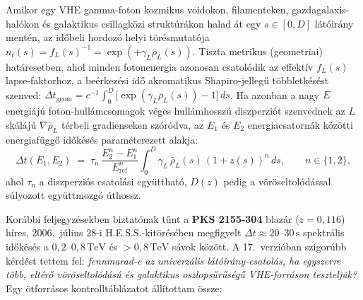 \par
Amikor egy VHE gamma-foton kozmikus voidokon, filamenteken, gazdagalaxis-hal\'okon \'es galaktikus csillagk\"ozi strukt\'ur\'akon halad \'at egy $s \in [0, D]$ l\'at\'oir\'any ment\'en, az id\H{o}beli hordoz\'o helyi t\"or\'esmutat\'oja $n_t(s) = f_L(s)^{-1} = \exp(+\gamma_L \bar{\rho}_L(s))$. Tiszta metrikus (geometriai) hat\'aresetben, ahol minden fotonenergia azonosan csatol\'odik az effekt\'iv $f_L(s)$ lapse-faktorhoz, a be\'erkez\'esi id\H{o} akromatikus Shapiro-jelleg\H{u} t\"obbletk\'es\'est szenved: $\Delta t_{\text{geom}} = c^{-1}\int_0^D \bigl[\exp(\gamma_L\bar{\rho}_L(s)) - 1\bigr]\,ds$. Ha azonban a nagy $E$ energi\'aj\'u foton-hull\'amcsomagok v\'eges hull\'amhossz\'u diszperzi\'ot szenvednek az $L$ sk\'al\'aj\'u $\nabla\bar{\rho}_L$ t\'erbeli gradienseken sz\'or\'odva, az $E_1$ \'es $E_2$ energiacsatorn\'ak k\"oz\"otti energiaf\"ugg\H{o} id\H{o}k\'es\'es param\'eterezett alakja:
\begin{equation}
  \Delta t(E_1, E_2) \;=\; \tau_n\,\frac{E_2^n - E_1^n}{E_{\text{ref}}^n}\int_0^D \gamma_L\,\bar{\rho}_L(s)\,(1+z(s))^n\,ds, \qquad n \in \{1, 2\},
\end{equation}
ahol $\tau_n$ a diszperzi\'os csatol\'asi egy\"utthat\'o, $D(z)$ pedig a v\"or\"oseltol\'od\'assal s\'ulyozott egy\"uttmozg\'o \'uthossz.

\par
Kor\'abbi feljegyz\'esekben biztat\'onak t\H{u}nt a \textbf{PKS 2155-304} blaz\'ar ($z = 0{,}116$) h\'ires, 2006.\ j\'ulius 28-i H.E.S.S.-kit\"or\'es\'eben megfigyelt $\Delta t \approx 20\text{--}30\,\text{s}$ spektr\'alis id\H{o}k\'es\'es a $0{,}2\text{--}0{,}8\,\text{TeV}$ \'es $>0{,}8\,\text{TeV}$ s\'avok k\"oz\"ott. A 17.\ verzi\'oban szigor\'ubb k\'erd\'est tettem fel: \emph{fennmarad-e az univerz\'alis l\'at\'oir\'any-csatol\'as, ha egyszerre t\"obb, elt\'er\H{o} v\"or\"oseltol\'od\'as\'u \'es galaktikus oszlops\H{u}r\H{u}s\'eg\H{u} VHE-forr\'ason tesztelj\"uk?} Egy \"otforr\'asos kontrollt\'abl\'azatot \'all\'itottam \"ossze:

